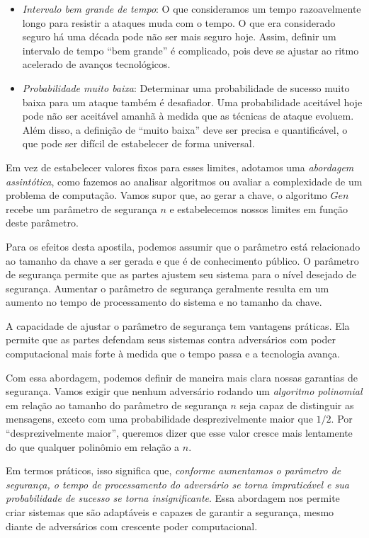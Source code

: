 \begin{itemize}
\item[] {\em Intervalo bem grande de tempo}:
  O que consideramos um tempo razoavelmente longo para resistir a ataques muda com o tempo.
  O que era considerado seguro há uma década pode não ser mais seguro hoje.
  Assim, definir um intervalo de tempo ``bem grande'' é complicado, pois deve se ajustar ao ritmo acelerado de avanços tecnológicos.

\item[] {\em Probabilidade muito baixa}:
  Determinar uma probabilidade de sucesso muito baixa para um ataque também é desafiador.
  Uma probabilidade aceitável hoje pode não ser aceitável amanhã à medida que as técnicas de ataque evoluem.
  Além disso, a definição de ``muito baixa'' deve ser precisa e quantificável, o que pode ser difícil de estabelecer de forma universal.
\end{itemize}

Em vez de estabelecer valores fixos para esses limites, adotamos uma {\em abordagem assintótica}, como fazemos ao analisar algoritmos ou avaliar a complexidade de um problema de computação.
Vamos supor que, ao gerar a chave, o algoritmo $Gen$ recebe um parâmetro de segurança $n$ e estabelecemos nossos limites em função deste parâmetro.

Para os efeitos desta apostila, podemos assumir que o parâmetro está relacionado ao tamanho da chave a ser gerada e que é de conhecimento público.
O parâmetro de segurança permite que as partes ajustem seu sistema para o nível desejado de segurança.
Aumentar o parâmetro de segurança geralmente resulta em um aumento no tempo de processamento do sistema e no tamanho da chave.

A capacidade de ajustar o parâmetro de segurança tem vantagens práticas.
Ela permite que as partes defendam seus sistemas contra adversários com poder computacional mais forte à medida que o tempo passa e a tecnologia avança.


Com essa abordagem, podemos definir de maneira mais clara nossas garantias de segurança.
Vamos exigir que nenhum adversário rodando um {\em algoritmo polinomial} em relação ao tamanho do parâmetro de segurança $n$ seja capaz de distinguir as mensagens, exceto com uma probabilidade desprezivelmente maior que $1/2$.
Por ``desprezivelmente maior'', queremos dizer que esse valor cresce mais lentamente do que qualquer polinômio em relação a $n$.

Em termos práticos, isso significa que, {\em conforme aumentamos o parâmetro de segurança, o tempo de processamento do adversário se torna impraticável e sua probabilidade de sucesso se torna insignificante}.
Essa abordagem nos permite criar sistemas que são adaptáveis e capazes de garantir a segurança, mesmo diante de adversários com crescente poder computacional.

